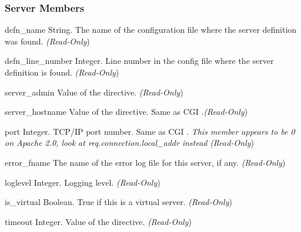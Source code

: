 \subsubsection{Server Members\label{pyapi-mpsrv-mem}}

\begin{memberdesc}[server]{defn_name}
  String. The name of the configuration file where the server definition
  was found.
  \emph{(Read-Only})
\end{memberdesc}

\begin{memberdesc}[server]{defn_line_number}
  Integer. Line number in the config file where the server definition is
  found.
  \emph{(Read-Only})
\end{memberdesc}

\begin{memberdesc}[server]{server_admin}
  Value of the  directive. 
  \emph{(Read-Only})
\end{memberdesc}

\begin{memberdesc}[server]{server_hostname}
  Value of the  directive. Same as CGI .\emph{(Read-Only})
\end{memberdesc}

\begin{memberdesc}[server]{port}
  Integer. TCP/IP port number. Same as CGI .
  \emph{This member appears to be 0 on Apache 2.0, look at req.connection.local_addr instead}
  \emph{(Read-Only})
\end{memberdesc}

\begin{memberdesc}[server]{error_fname}
  The name of the error log file for this server, if any.
  \emph{(Read-Only})
\end{memberdesc}

\begin{memberdesc}[server]{loglevel}
  Integer. Logging level.
  \emph{(Read-Only})
\end{memberdesc}

\begin{memberdesc}[server]{is_virtual}
  Boolean. True if this is a virtual server.
  \emph{(Read-Only})
\end{memberdesc}

\begin{memberdesc}[server]{timeout}
  Integer. Value of the  directive.
  \emph{(Read-Only})
\end{memberdesc}

